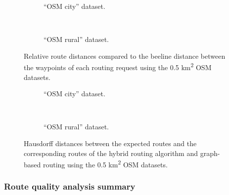 			\begin{figure}[h!]
				\begin{subfigure}[t]{\linewidth}
					\begin{figcenter}
						
					\end{figcenter}
					\caption{\enquote{OSM city} dataset.}
					\label{fig:eval-route-distances-city}
				\end{subfigure}
				\\[3ex]
				\begin{subfigure}[t]{\linewidth}
					\begin{figcenter}
						
					\end{figcenter}
					\caption{\enquote{OSM rural} dataset.}
					\label{fig:eval-route-distances-rural}
				\end{subfigure}
				\caption[Relative route distance comparison.]{Relative route distances compared to the beeline distance between the waypoints of each routing request using the 0.5 km\textsuperscript{2} OSM datasets.}
				\label{fig:eval-route-distances}
				\vspace{3ex}
				\begin{subfigure}[t]{\linewidth}
					\begin{figcenter}
						
					\end{figcenter}
					\caption{\enquote{OSM city} dataset.}
					\label{fig:eval-hausdorff-city}
				\end{subfigure}
				\\[3ex]
				\begin{subfigure}[t]{\linewidth}
					\begin{figcenter}
						
					\end{figcenter}
					\caption{\enquote{OSM rural} dataset.}
					\label{fig:eval-hausdorff-rural}
				\end{subfigure}
				\caption[Hausdorff distance comparison.]{Hausdorff distances between the expected routes and the corresponding routes of the hybrid routing algorithm and graph-based routing using the 0.5 km\textsuperscript{2} OSM datasets.}
				\label{fig:eval-hausdorff}
			\end{figure}

		\subsubsection{Route quality analysis summary}
			
